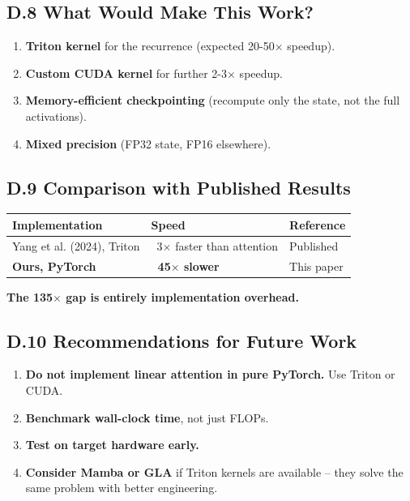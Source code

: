 \subsection{D.8 What Would Make This Work?}

\begin{enumerate}
\item \textbf{Triton kernel} for the recurrence (expected 20-50$\times$ speedup).
\item \textbf{Custom CUDA kernel} for further 2-3$\times$ speedup.
\item \textbf{Memory-efficient checkpointing} (recompute only the state, not the
  full activations).
\item \textbf{Mixed precision} (FP32 state, FP16 elsewhere).

\end{enumerate}
\subsection{D.9 Comparison with Published Results}

\begin{table}[H]
\centering
\small
\begin{tabular}{lll}
\toprule
\textbf{Implementation} & \textbf{Speed} & \textbf{Reference} \\
\midrule
Yang et al. (2024), Triton & ~3$\times$ faster than attention & Published \\
\textbf{Ours, PyTorch} & \textbf{~45$\times$ slower} & This paper \\
\bottomrule
\end{tabular}
\end{table}

\textbf{The 135$\times$ gap is entirely implementation overhead.}

\subsection{D.10 Recommendations for Future Work}

\begin{enumerate}
\item \textbf{Do not implement linear attention in pure PyTorch.} Use Triton or CUDA.
\item \textbf{Benchmark wall-clock time}, not just FLOPs.
\item \textbf{Test on target hardware early.}
\item \textbf{Consider Mamba or GLA} if Triton kernels are available -- they
  solve the same problem with better engineering.

\end{enumerate}



